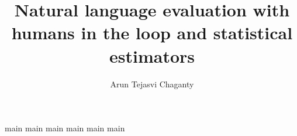 \documentclass{report}
\begin{document}
\title{Natural language evaluation with humans in the loop and statistical estimators}
\author{Arun Tejasvi Chaganty}
 
\beforepreface{}


\afterpreface{}

{main}
{main}
{main}
{main}
{main}
{main}

\appendix

%


\end{document}
